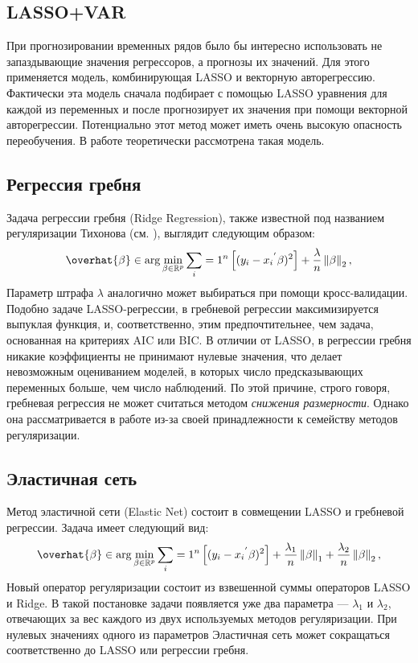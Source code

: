 \subsection{LASSO+VAR}

При прогнозировании временных рядов было бы интересно использовать не запаздывающие значения регрессоров, а прогнозы их значений. Для этого применяется модель, комбинирующая LASSO и векторную авторегрессию. Фактически эта модель сначала подбирает с помощью LASSO уравнения для каждой из переменных и после прогнозирует их значения при помощи векторной авторегрессии. Потенциально этот метод может иметь очень высокую опасность переобучения. В работе \cite{gredenhoff1999lag} теоретически рассмотрена такая модель.

\subsection{Регрессия гребня}
Задача регрессии гребня (Ridge Regression), также известной под названием регуляризации Тихонова (см. \cite{тихонов1963решении}), выглядит следующим образом:
\begin{equation}
\overhat{\beta} \in \arg \min_{\beta \in
\mathbb{R}^p} \sum_i=1^n \left[ (y_i - {x_i}^{'} \beta)^2 \right] +  \frac{\lambda}{n} \left\lVert \beta \right\rVert_2,
\end{equation}
Параметр штрафа $\lambda$ аналогично может выбираться при помощи кросс-валидации.
Подобно задаче LASSO-регрессии, в гребневой регрессии максимизируется выпуклая функция, и, соответственно, этим предпочтительнее, чем задача, основанная на критериях AIC или BIC.
В отличии от LASSO, в регрессии гребня никакие коэффициенты не принимают нулевые значения, что делает невозможным оцениванием моделей, в которых число предсказывающих переменных больше, чем число наблюдений.  По этой причине, строго говоря, гребневая регрессия не может считаться методом \textit{снижения размерности}. Однако она рассматривается в работе из-за своей принадлежности к семейству методов регуляризации.

\subsection{Эластичная сеть}
Метод эластичной сети (Elastic Net) состоит в совмещении LASSO и гребневой регрессии. Задача имеет следующий вид:
\begin{equation}
\overhat{\beta} \in \arg \min_{\beta \in
\mathbb{R}^p} \sum_i=1^n \left[ (y_i - {x_i}^{'} \beta)^2 \right] +  \frac{\lambda_1}{n} \left\lVert \beta \right\rVert_1 + \frac{\lambda_2}{n} \left\lVert \beta \right\rVert_2,
\end{equation}
Новый оператор регуляризации состоит из взвешенной суммы операторов LASSO и Ridge. В такой постановке задачи появляется уже два параметра --- $\lambda_1$ и $\lambda_2$, отвечающих за вес каждого из двух используемых методов регуляризации. При нулевых значениях одного из параметров Эластичная сеть может сокращаться соответственно до LASSO или регрессии гребня.

